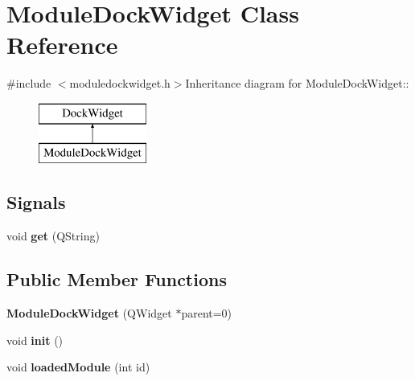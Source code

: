 \hypertarget{classModuleDockWidget}{
\section{ModuleDockWidget Class Reference}
\label{classModuleDockWidget}
}


{\ttfamily \#include $<$moduledockwidget.h$>$}Inheritance diagram for ModuleDockWidget::\begin{figure}[H]
\begin{center}
\leavevmode
\includegraphics[height=2cm]{classModuleDockWidget}
\end{center}
\end{figure}
\subsection*{Signals}
\begin{DoxyCompactItemize}
\item 
\hypertarget{classModuleDockWidget_aa784306e1a4fcf56569177dcaef96b25}{
void {\bfseries get} (QString)}
\label{classModuleDockWidget_aa784306e1a4fcf56569177dcaef96b25}

\end{DoxyCompactItemize}
\subsection*{Public Member Functions}
\begin{DoxyCompactItemize}
\item 
\hypertarget{classModuleDockWidget_a864ef7e5df97d96feb92f67a401c0d6b}{
{\bfseries ModuleDockWidget} (QWidget $\ast$parent=0)}
\label{classModuleDockWidget_a864ef7e5df97d96feb92f67a401c0d6b}

\item 
\hypertarget{classModuleDockWidget_acdce295969ddf4230362ccc87bc8be42}{
void {\bfseries init} ()}
\label{classModuleDockWidget_acdce295969ddf4230362ccc87bc8be42}

\item 
\hypertarget{classModuleDockWidget_adacdb1e6fbfb1f3be9537dfc8adc2ec9}{
void {\bfseries loadedModule} (int id)}
\label{classModuleDockWidget_adacdb1e6fbfb1f3be9537dfc8adc2ec9}

\end{DoxyCompactItemize}
